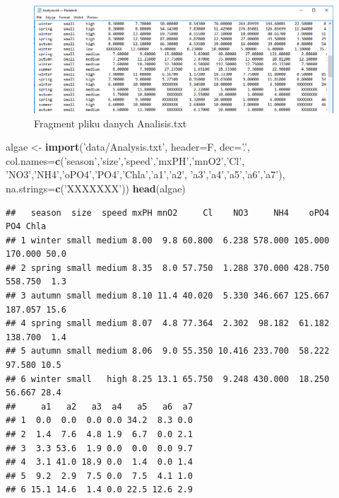 \documentclass[]{book}
\newenvironment{Shaded}{\begin{snugshade}}{\end{snugshade}}
\newcommand{\DataTypeTok}[1]{\textcolor[rgb]{0.13,0.29,0.53}{#1}}
\newcommand{\KeywordTok}[1]{\textcolor[rgb]{0.13,0.29,0.53}{\textbf{#1}}}
\newcommand{\NormalTok}[1]{#1}
\newcommand{\StringTok}[1]{\textcolor[rgb]{0.31,0.60,0.02}{#1}}
\theoremstyle{plain}
\theoremstyle{definition}
\theoremstyle{definition}
\theoremstyle{definition}
\theoremstyle{definition}
\theoremstyle{remark}
\begin{document}
\begin{figure}
\includegraphics[width=10.67in]{images/analalysi_foto} \caption{Fragment pliku danych Analisis.txt}\label{fig:foto}
\end{figure}

\begin{Shaded}
\begin{Highlighting}[]
\NormalTok{algae <-}\StringTok{ }\KeywordTok{import}\NormalTok{(}\StringTok{'data/Analysis.txt'}\NormalTok{, }\DataTypeTok{header=}\NormalTok{F, }
                \DataTypeTok{dec=}\StringTok{'.'}\NormalTok{, }
                \DataTypeTok{col.names=}\KeywordTok{c}\NormalTok{(}\StringTok{'season'}\NormalTok{,}\StringTok{'size'}\NormalTok{,}\StringTok{'speed'}\NormalTok{,}\StringTok{'mxPH'}\NormalTok{,}\StringTok{'mnO2'}\NormalTok{,}\StringTok{'Cl'}\NormalTok{,}
                            \StringTok{'NO3'}\NormalTok{,}\StringTok{'NH4'}\NormalTok{,}\StringTok{'oPO4'}\NormalTok{,}\StringTok{'PO4'}\NormalTok{,}\StringTok{'Chla'}\NormalTok{,}\StringTok{'a1'}\NormalTok{,}\StringTok{'a2'}\NormalTok{,}
                            \StringTok{'a3'}\NormalTok{,}\StringTok{'a4'}\NormalTok{,}\StringTok{'a5'}\NormalTok{,}\StringTok{'a6'}\NormalTok{,}\StringTok{'a7'}\NormalTok{),}
                \DataTypeTok{na.strings=}\KeywordTok{c}\NormalTok{(}\StringTok{'XXXXXXX'}\NormalTok{))}
\KeywordTok{head}\NormalTok{(algae)}
\end{Highlighting}
\end{Shaded}

\begin{verbatim}
##   season  size  speed mxPH mnO2     Cl    NO3     NH4    oPO4     PO4 Chla
## 1 winter small medium 8.00  9.8 60.800  6.238 578.000 105.000 170.000 50.0
## 2 spring small medium 8.35  8.0 57.750  1.288 370.000 428.750 558.750  1.3
## 3 autumn small medium 8.10 11.4 40.020  5.330 346.667 125.667 187.057 15.6
## 4 spring small medium 8.07  4.8 77.364  2.302  98.182  61.182 138.700  1.4
## 5 autumn small medium 8.06  9.0 55.350 10.416 233.700  58.222  97.580 10.5
## 6 winter small   high 8.25 13.1 65.750  9.248 430.000  18.250  56.667 28.4
##     a1   a2   a3  a4   a5   a6  a7
## 1  0.0  0.0  0.0 0.0 34.2  8.3 0.0
## 2  1.4  7.6  4.8 1.9  6.7  0.0 2.1
## 3  3.3 53.6  1.9 0.0  0.0  0.0 9.7
## 4  3.1 41.0 18.9 0.0  1.4  0.0 1.4
## 5  9.2  2.9  7.5 0.0  7.5  4.1 1.0
## 6 15.1 14.6  1.4 0.0 22.5 12.6 2.9
\end{verbatim}
\end{document}
